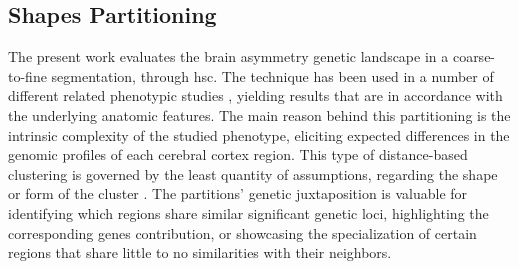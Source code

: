 \subsection{Shapes Partitioning}
The present work evaluates the brain asymmetry genetic landscape in a coarse-to-fine segmentation, through \acf{hsc}. The technique has been used in a number of different related phenotypic studies \cite{Claes2018}\cite{Naqvi2021}, yielding results that are in accordance with the underlying anatomic features. The main reason behind this partitioning is the intrinsic complexity of the studied phenotype, eliciting expected differences in the genomic profiles of each cerebral cortex region. This type of distance-based clustering is governed by the least quantity of assumptions, regarding the shape or form of the cluster \cite{VonLuxburg2007}. The partitions' genetic juxtaposition is valuable for identifying which regions share similar significant genetic loci, highlighting the corresponding genes contribution, or showcasing the specialization of certain regions that share little to no similarities with their neighbors.

